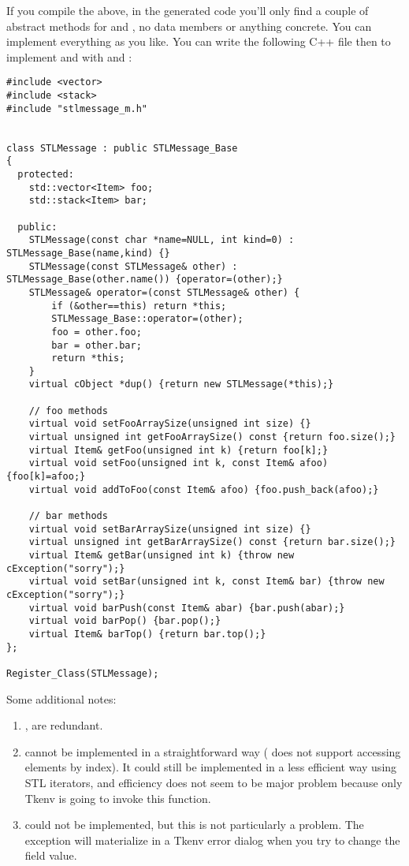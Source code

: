 If you compile the above, in the generated code you'll only find a couple of
abstract methods for  and , no data members or anything concrete.
You can implement everything as you like. You can write the following C++ file
then to implement  and  with  and :

\begin{verbatim}
#include <vector>
#include <stack>
#include "stlmessage_m.h"


class STLMessage : public STLMessage_Base
{
  protected:
    std::vector<Item> foo;
    std::stack<Item> bar;

  public:
    STLMessage(const char *name=NULL, int kind=0) : STLMessage_Base(name,kind) {}
    STLMessage(const STLMessage& other) : STLMessage_Base(other.name()) {operator=(other);}
    STLMessage& operator=(const STLMessage& other) {
        if (&other==this) return *this;
        STLMessage_Base::operator=(other);
        foo = other.foo;
        bar = other.bar;
        return *this;
    }
    virtual cObject *dup() {return new STLMessage(*this);}

    // foo methods
    virtual void setFooArraySize(unsigned int size) {}
    virtual unsigned int getFooArraySize() const {return foo.size();}
    virtual Item& getFoo(unsigned int k) {return foo[k];}
    virtual void setFoo(unsigned int k, const Item& afoo) {foo[k]=afoo;}
    virtual void addToFoo(const Item& afoo) {foo.push_back(afoo);}

    // bar methods
    virtual void setBarArraySize(unsigned int size) {}
    virtual unsigned int getBarArraySize() const {return bar.size();}
    virtual Item& getBar(unsigned int k) {throw new cException("sorry");}
    virtual void setBar(unsigned int k, const Item& bar) {throw new cException("sorry");}
    virtual void barPush(const Item& abar) {bar.push(abar);}
    virtual void barPop() {bar.pop();}
    virtual Item& barTop() {return bar.top();}
};

Register_Class(STLMessage);
\end{verbatim}

Some additional notes:

\begin{enumerate}
  \item{,  are redundant.}
  \item{ cannot be implemented in a straightforward way
     ( does not support accessing elements by index).
     It could still be implemented in a less efficient way using STL iterators,
     and efficiency does not seem to be major problem because only Tkenv
     is going to invoke this function.}
  \item{ could not be implemented, but this
     is not particularly a problem. The exception will materialize in a
     Tkenv error dialog when you try to change the field value.}
\end{enumerate}

